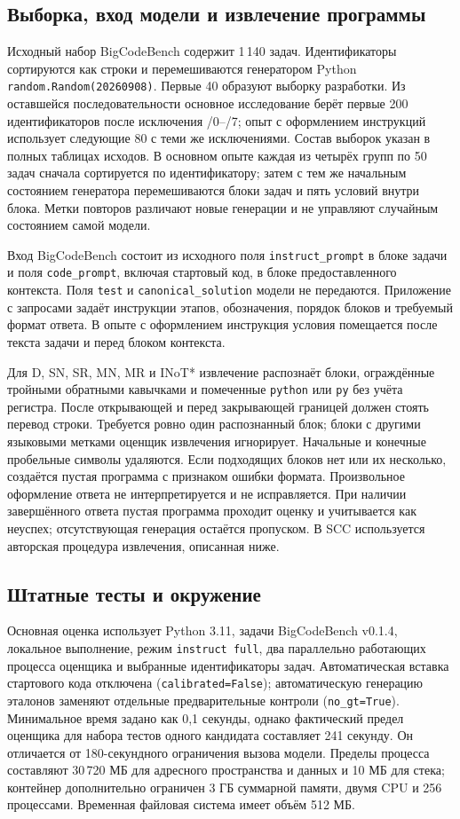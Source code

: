 \subsection{Выборка, вход модели и извлечение программы}
Исходный набор BigCodeBench содержит 1\,140 задач. Идентификаторы сортируются как строки и перемешиваются генератором Python \texttt{random.Random(20260908)}. Первые 40 образуют выборку разработки. Из оставшейся последовательности основное исследование берёт первые 200 идентификаторов после исключения /0--/7; опыт с оформлением инструкций использует следующие 80 с теми же исключениями. Состав выборок указан в полных таблицах исходов. В основном опыте каждая из четырёх групп по 50 задач сначала сортируется по идентификатору; затем с тем же начальным состоянием генератора перемешиваются блоки задач и пять условий внутри блока. Метки повторов различают новые генерации и не управляют случайным состоянием самой модели.

Вход BigCodeBench состоит из исходного поля \texttt{instruct\_prompt} в блоке задачи и поля \texttt{code\_prompt}, включая стартовый код, в блоке предоставленного контекста. Поля \texttt{test} и \texttt{canonical\_solution} модели не передаются. Приложение с запросами задаёт инструкции этапов, обозначения, порядок блоков и требуемый формат ответа. В опыте с оформлением инструкция условия помещается после текста задачи и перед блоком контекста.

Для D, SN, SR, MN, MR и INoT* извлечение распознаёт блоки, ограждённые тройными обратными кавычками и помеченные \texttt{python} или \texttt{py} без учёта регистра. После открывающей и перед закрывающей границей должен стоять перевод строки. Требуется ровно один распознанный блок; блоки с другими языковыми метками оценщик извлечения игнорирует. Начальные и конечные пробельные символы удаляются. Если подходящих блоков нет или их несколько, создаётся пустая программа с признаком ошибки формата. Произвольное оформление ответа не интерпретируется и не исправляется. При наличии завершённого ответа пустая программа проходит оценку и учитывается как неуспех; отсутствующая генерация остаётся пропуском. В SCC используется авторская процедура извлечения, описанная ниже.

\subsection{Штатные тесты и окружение}
Основная оценка использует Python 3.11, задачи BigCodeBench v0.1.4, локальное выполнение, режим \texttt{instruct full}, два параллельно работающих процесса оценщика и выбранные идентификаторы задач. Автоматическая вставка стартового кода отключена (\texttt{calibrated=False}); автоматическую генерацию эталонов заменяют отдельные предварительные контроли (\texttt{no\_gt=True}). Минимальное время задано как 0,1 секунды, однако фактический предел оценщика для набора тестов одного кандидата составляет 241 секунду. Он отличается от 180-секундного ограничения вызова модели. Пределы процесса составляют 30\,720 МБ для адресного пространства и данных и 10 МБ для стека; контейнер дополнительно ограничен 3 ГБ суммарной памяти, двумя CPU и 256 процессами. Временная файловая система имеет объём 512 МБ.

